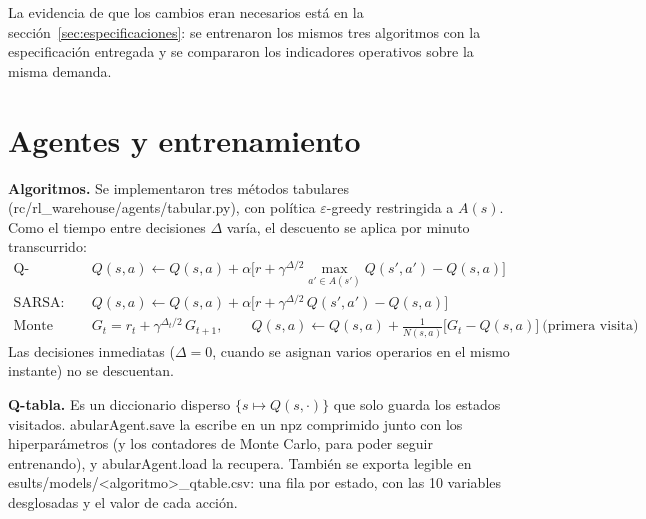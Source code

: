 \documentclass[11pt,letterpaper]{article}
\makeatletter
\newcommand{\code}[1]{{\ttfamily\codebreaks#1\endcodebreaks}}
\def\codebreaks#1\endcodebreaks{\@codebreaks#1\@nil}
\def\@codebreaks#1{\ifx#1\@nil\else\ifx#1/\slash\else\ifx#1\_\_\allowbreak\else#1\fi\fi\expandafter\@codebreaks\fi}
\makeatother
\begin{document}
La evidencia de que los cambios eran necesarios está en la sección~\ref{sec:especificaciones}: se
entrenaron los mismos tres algoritmos con la especificación entregada y se compararon los indicadores
operativos sobre la misma demanda.

\section{Agentes y entrenamiento}

\textbf{Algoritmos.} Se implementaron tres métodos tabulares (\code{src/rl\_warehouse/agents/tabular.py}),
con política $\varepsilon$-greedy restringida a $A(s)$. Como el tiempo entre decisiones $\Delta$ varía, el
descuento se aplica por minuto transcurrido:
\begin{align*}
\text{Q-learning:}\quad & Q(s,a) \leftarrow Q(s,a) + \alpha\Big[r + \gamma^{\Delta/2}\max_{a'\in A(s')}Q(s',a') - Q(s,a)\Big] \\
\text{SARSA:}\quad & Q(s,a) \leftarrow Q(s,a) + \alpha\Big[r + \gamma^{\Delta/2}\,Q(s',a') - Q(s,a)\Big] \\
\text{Monte Carlo:}\quad & G_t = r_t + \gamma^{\Delta_t/2}\,G_{t+1},\qquad Q(s,a) \leftarrow Q(s,a) + \tfrac{1}{N(s,a)}\big[G_t - Q(s,a)\big]\ \text{(primera visita)}
\end{align*}
Las decisiones inmediatas ($\Delta=0$, cuando se asignan varios operarios en el mismo instante) no se descuentan.

\textbf{Q-tabla.} Es un diccionario disperso $\{s\mapsto Q(s,\cdot)\}$ que solo guarda los estados visitados.
\code{TabularAgent.save} la escribe en un \code{.npz} comprimido junto con los hiperparámetros (y los
contadores de Monte Carlo, para poder seguir entrenando), y \code{TabularAgent.load} la recupera. También
se exporta legible en \code{results/models/<algoritmo>\_qtable.csv}: una fila por estado, con las 10
variables desglosadas y el valor de cada acción.
\end{document}
